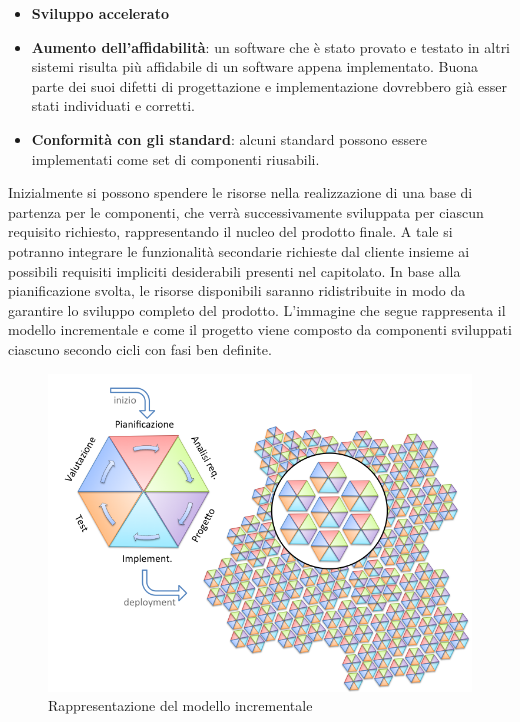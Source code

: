\begin{itemize}
\begin{itemize}
			\item \textbf{Sviluppo accelerato}
			\item \textbf{Aumento dell'affidabilità}: un software che è stato provato e testato in altri sistemi risulta più affidabile di un software appena implementato.
			Buona parte dei suoi difetti di progettazione e implementazione dovrebbero già esser stati individuati e corretti.
			\item \textbf{Conformità con gli standard}: alcuni standard
			possono essere implementati come set di componenti riusabili.
		\end{itemize}
	\end{itemize}
	Inizialmente si possono spendere le risorse nella realizzazione di una base di partenza per le componenti, che verrà successivamente sviluppata per ciascun requisito richiesto, rappresentando il nucleo del prodotto finale.
	A tale  si potranno integrare le funzionalità secondarie richieste dal cliente insieme ai possibili requisiti impliciti desiderabili presenti nel capitolato. In base alla pianificazione svolta, le risorse disponibili saranno ridistribuite in modo da garantire lo sviluppo completo del prodotto.
	L'immagine che segue rappresenta il modello incrementale e come il progetto viene composto da componenti sviluppati ciascuno secondo cicli con fasi ben definite.
	\begin{figure}[H]
		\centering
		\includegraphics[scale=0.5]{img/modello_incrementale.png}
		\caption{Rappresentazione del modello incrementale\protect\footnotemark}
		\label{fig:modello_incrementale}
	\end{figure}

	